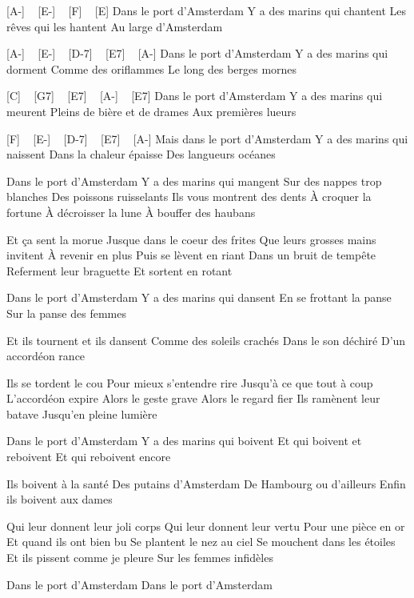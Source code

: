 
[A-] ~ [E-] ~ [F] ~ [E]
Dans le port d'Amsterdam
Y a des marins qui chantent
Les rêves qui les hantent
Au large d'Amsterdam

[A-] ~ [E-]  ~ [D-7] ~ [E7] ~ [A-]
Dans le port d'Amsterdam
Y a des marins qui dorment
Comme des oriflammes
Le long des berges mornes

[C] ~ [G7] ~ [E7] ~ [A-] ~ [E7]
Dans le port d'Amsterdam
Y a des marins qui meurent
Pleins de bière et de drames
Aux premières lueurs

[F] ~ [E-] ~ [D-7] ~ [E7] ~ [A-]
Mais dans le port d'Amsterdam
Y a des marins qui naissent
Dans la chaleur épaisse
Des langueurs océanes

Dans le port d'Amsterdam
Y a des marins qui mangent
Sur des nappes trop blanches
Des poissons ruisselants
Ils vous montrent des dents
À croquer la fortune
À décroisser la lune
À bouffer des haubans

Et ça sent la morue
Jusque dans le coeur des frites
Que leurs grosses mains invitent
À revenir en plus
Puis se lèvent en riant
Dans un bruit de tempête
Referment leur braguette
Et sortent en rotant

Dans le port d'Amsterdam
Y a des marins qui dansent
En se frottant la panse
Sur la panse des femmes

Et ils tournent et ils dansent
Comme des soleils crachés
Dans le son déchiré
D'un accordéon rance

Ils se tordent le cou
Pour mieux s'entendre rire
Jusqu'à ce que tout à coup
L'accordéon expire
Alors le geste grave
Alors le regard fier
Ils ramènent leur batave
Jusqu'en pleine lumière

Dans le port d'Amsterdam
Y a des marins qui boivent
Et qui boivent et reboivent
Et qui reboivent encore

Ils boivent à la santé
Des putains d'Amsterdam
De Hambourg ou d'ailleurs
Enfin ils boivent aux dames

Qui leur donnent leur joli corps
Qui leur donnent leur vertu
Pour une pièce en or
Et quand ils ont bien bu
Se plantent le nez au ciel
Se mouchent dans les étoiles
Et ils pissent comme je pleure
Sur les femmes infidèles

Dans le port d'Amsterdam
Dans le port d'Amsterdam